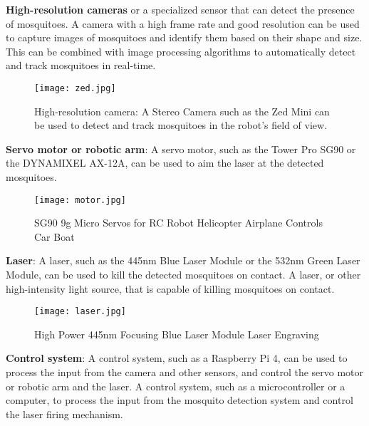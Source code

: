 \documentclass[11pt]{article}
\begin{document}
		
	
	\textbf{High-resolution cameras} or a specialized sensor that can detect the presence of mosquitoes. A camera with a high frame rate and good resolution can be used to capture images of mosquitoes and identify them based on their shape and size. This can be combined with image processing algorithms to automatically detect and track mosquitoes in real-time.
	
	
		 \begin{center}
		
		
		\begin{figure}[H]
			\centering
			\texttt{[image: zed.jpg]}
			\caption{High-resolution camera: A Stereo Camera such as the Zed Mini can be used to detect and track mosquitoes in the robot's field of view.}  
			\label{fig:Flowchart}
		\end{figure}
	\end{center}
	
	

	
		\textbf{Servo motor or robotic arm}: A servo motor, such as the Tower Pro SG90 or the DYNAMIXEL AX-12A, can be used to aim the laser at the detected mosquitoes.	
	 \begin{center}
		
		
		\begin{figure}[H]
			\centering
			\texttt{[image: motor.jpg]}
			\caption{SG90 9g Micro Servos for RC Robot Helicopter Airplane Controls Car Boat}  
		\label{fig:Flowchart}
	\end{figure}
\end{center}
	
	
	
	\textbf{Laser}: A laser, such as the 445nm Blue Laser Module or the 532nm Green Laser Module, can be used to kill the detected mosquitoes on contact.	A laser, or other high-intensity light source, that is capable of killing mosquitoes on contact.
	
	 \begin{center}
		
		
		\begin{figure}[H]
			\centering
			\texttt{[image: laser.jpg]}
			\caption{High Power 445nm Focusing Blue Laser Module Laser Engraving}  
			\label{fig:Flowchart}
		\end{figure}
	\end{center}
	
	\textbf{Control system}: A control system, such as a Raspberry Pi 4, can be used to process the input from the camera and other sensors, and control the servo motor or robotic arm and the laser.	A control system, such as a microcontroller or a computer, to process the input from the mosquito detection system and control the laser firing mechanism.
	
\end{document}
